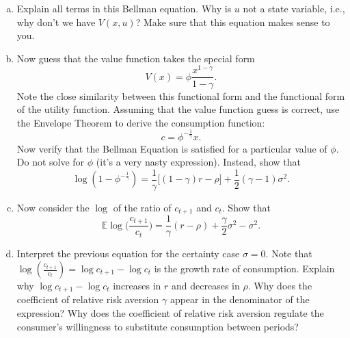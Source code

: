 \documentclass[11pt]{extarticle}
\theoremstyle{plain}
\theoremstyle{definition}
\begin{document}
\begin{enumerate}[(a)]
\item Explain all terms in this Bellman equation. Why is $u$ not a state variable, i.e., why don't we have $V(x, u)$? Make sure that this equation makes sense to you.


\item Now guess that the value function takes the special form
\begin{equation*}
	V(x) = \phi \frac{x^{1-\gamma}}{1-\gamma} .
\end{equation*}
Note the close similarity between this functional form and the functional form of the utility function. Assuming that the value function guess is correct, use the Envelope Theorem to derive the consumption function:
\begin{equation*}
c=\phi^{-\frac{1}{\gamma}} x .
\end{equation*}
Now verify that the Bellman Equation is satisfied for a particular value of $\phi$. Do not solve for $\phi$ (it's a very nasty expression). Instead, show that
\begin{equation*}
	\log (1 - \phi^{-\frac{1}{\gamma}}) = \frac{1}{\gamma} \Big[ (1-\gamma) r - \rho \Big] + \frac{1}{2}(\gamma-1) \sigma^2.
\end{equation*}


\item Now consider the $\log$ of the ratio of $c_{t+1}$ and $c_t$. Show that
\begin{equation*}
	\mathbb E \log \bigg(\frac{c_{t+1}}{c_t}\bigg) = \frac{1}{\gamma}(r-\rho) + \frac{\gamma}{2} \sigma^2 - \sigma^2.
\end{equation*}


\item Interpret the previous equation for the certainty case $\sigma = 0$. Note that $\log (\frac{c_{t+1}}{c_t}) = \log c_{t+1} - \log c_t$ is the growth rate of consumption. Explain why $\log c_{t+1} - \log c_t$ increases in $r$ and decreases in $\rho$. Why does the coefficient of relative risk aversion $\gamma$ appear in the denominator of the expression? Why does the coefficient of relative risk aversion regulate the consumer's willingness to substitute consumption between periods?

\end{enumerate}




\vspace{5mm}
\end{document}
